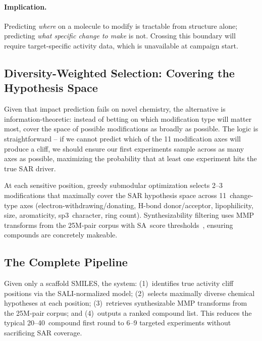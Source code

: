 \documentclass[sigconf, nonacm]{acmart}
\begin{document}
\paragraph{Implication.} Predicting \textit{where} on a molecule to modify is tractable from structure alone; predicting \textit{what specific change to make} is not. Crossing this boundary will require target-specific activity data, which is unavailable at campaign start.

\subsection{Diversity-Weighted Selection: Covering the Hypothesis Space}

Given that impact prediction fails on novel chemistry, the alternative is information-theoretic: instead of betting on which modification type will matter most, cover the space of possible modifications as broadly as possible. The logic is straightforward -- if we cannot predict which of the 11 modification axes will produce a cliff, we should ensure our first experiments sample across as many axes as possible, maximizing the probability that at least one experiment hits the true SAR driver.

At each sensitive position, greedy submodular optimization selects 2--3 modifications that maximally cover the SAR hypothesis space across 11~change-type axes (electron-withdrawing/donating, H-bond donor/acceptor, lipophilicity, size, aromaticity, sp3~character, ring count). Synthesizability filtering uses MMP transforms from the 25M-pair corpus with SA~score thresholds~\cite{Swanson2024,Gao2020}, ensuring compounds are concretely makeable.

\subsection{The Complete Pipeline}

Given only a scaffold SMILES, the system: (1)~identifies true activity cliff positions via the SALI-normalized model; (2)~selects maximally diverse chemical hypotheses at each position; (3)~retrieves synthesizable MMP transforms from the 25M-pair corpus; and (4)~outputs a ranked compound list. This reduces the typical 20--40~compound first round to 6--9 targeted experiments without sacrificing SAR coverage.

\end{document}
